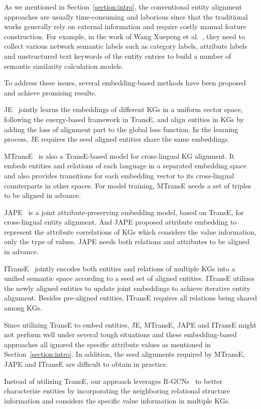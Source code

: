 	As we mentioned in Section~\ref{section:intro}, the conventional entity alignment approaches are usually time-consuming and laborious since that the traditional works generally rely on external information and require costly manual feature construction. For example, in the work of Wang Xuepeng et al.~, they need to collect various network semantic labels such as category labels, attribute labels and unstructured text keywords of the entity entries to build a number of semantic similarity calculation models.
	
	To address these issues, several embedding-based methods have been proposed and achieve promising results.
	
	JE~\cite{hao2016joint} jointly learns the embeddings of different KGs in a uniform vector space, following the energy-based framework in TransE, and align entities in KGs by adding the loss of alignment part to the global loss function. In the learning process, JE requires the seed aligned entities share the same embeddings. 
	
	MTransE~\cite{chen2016multilingual} is also a TransE-based model for cross-lingual KG alignment. It embeds entities and relations of each language in a separated embedding space and also provides transitions for each embedding vector to its cross-lingual counterparts in other spaces. For model training, MTransE needs a set of triples to be aligned in advance.
	
	JAPE~\cite{sun2017cross} is a joint attribute-preserving embedding model, based on TransE, for cross-lingual entity alignment. And JAPE proposed attribute embedding to represent the attribute correlations of KGs which considers the value information, only the type of values. JAPE needs both relations and attributes to be aligned in advance.
	
	ITransE~\cite{zhu2017iterative} jointly encodes both entities and relations of multiple KGs into a unified semantic space according to a seed set of aligned entities. ITransE utilizes the newly aligned entities to update joint embeddings to achieve iterative entity alignment. Besides pre-aligned entities, ITransE requires all relations being shared among KGs.
	
	Since utilizing TransE to embed entities, JE, MTransE, JAPE and ITransE might not perform well under several tough situations and these embedding-based approaches all ignored the specific attribute values as mentioned in Section~\ref{section:intro}. In addition, the seed alignments required by MTransE, JAPE and ITransE are difficult to obtain in practice.
	
	Instead of utilizing TransE, our approach leverages R-GCNs~\cite{Schlichtkrull2017Modeling} to better characterize entities by incorporating the neighboring relational structure information and considers the specific value information in multiple KGs.
